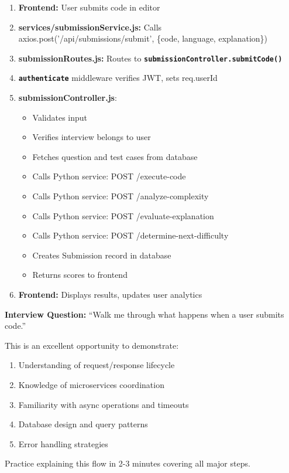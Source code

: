 \documentclass[12pt,a4paper,oneside]{article}
\newcommand{\funcname}[1]{\texttt{\textbf{#1}}}
\begin{document}
\begin{enumerate}
    \item \textbf{Frontend:} User submits code in editor
    \item \textbf{services/submissionService.js:} Calls axios.post('/api/submissions/submit', \{code, language, explanation\})
    \item \textbf{submissionRoutes.js:} Routes to \funcname{submissionController.submitCode()}
    \item \funcname{authenticate} middleware verifies JWT, sets req.userId
    \item \textbf{submissionController.js}: 
    \begin{itemize}
        \item Validates input
        \item Verifies interview belongs to user
        \item Fetches question and test cases from database
        \item Calls Python service: POST /execute-code
        \item Calls Python service: POST /analyze-complexity
        \item Calls Python service: POST /evaluate-explanation
        \item Calls Python service: POST /determine-next-difficulty
        \item Creates Submission record in database
        \item Returns scores to frontend
    \end{itemize}
    \item \textbf{Frontend:} Displays results, updates user analytics
\end{enumerate}

\begin{interviewtipbox}
\textbf{Interview Question:} ``Walk me through what happens when a user submits code.''

This is an excellent opportunity to demonstrate:
\begin{enumerate}
    \item Understanding of request/response lifecycle
    \item Knowledge of microservices coordination
    \item Familiarity with async operations and timeouts
    \item Database design and query patterns
    \item Error handling strategies
\end{enumerate}

Practice explaining this flow in 2-3 minutes covering all major steps.
\end{interviewtipbox}
\end{document}
